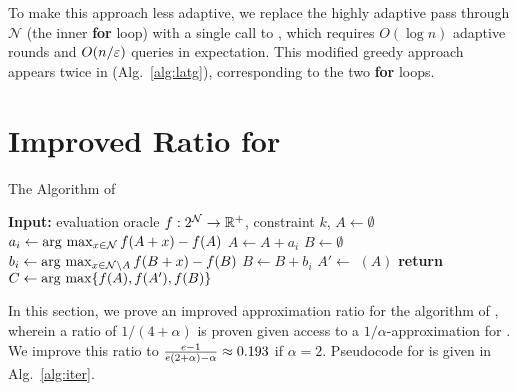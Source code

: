 To make this approach less adaptive,
we replace the highly adaptive pass through $\mathcal N$ (the inner \textbf{for} loop)
with a single call to \thresam, which requires $O( \log n )$
adaptive rounds and $O(n / \varepsilon)$ queries in expectation.
This modified greedy approach appears twice in \latg (Alg.~\ref{alg:latg}),
corresponding to the two \textbf{for} loops. 
\section{Improved Ratio for \iter} \label{apx:iter}
\begin{algorithm}[t]
   \caption{The \iter Algorithm of }
   \label{alg:iter}
   \begin{algorithmic}[1]
     \State \textbf{Input:} evaluation oracle $f:2^{\mathcal N} \to \mathbb{R}^+$, constraint $k$,
     \State $A \gets \emptyset$
     \State $a_i \gets \arg\, \max_{x \in \mathcal N} f( A + x ) - f(A)$
     \State $A \gets A + a_i$
     \EndFor
     \State $B \gets \emptyset$
     \State $b_i \gets \arg\, \max_{x \in \mathcal N \setminus A} f ( B + x ) - f (B)$
     \State $B \gets B + b_i$
     \EndFor
     \State $A' \gets $ \unc $(A)$
     \State \textbf{return} $C \gets \arg\, \max \{ f(A), f(A'), f(B) \}$
     \EndProcedure
\end{algorithmic}
\end{algorithm}
In this section, we prove an improved approximation ratio
for the algorithm \iter of , wherein a
ratio of $1/(4 + \alpha)$ is proven given access to
a $1/\alpha$-approximation for \unc. 
We improve this ratio to $\frac{e - 1}{e(2 + \alpha) - \alpha} \approx 0.193$ if $\alpha = 2$.
Pseudocode for \iter
is given in Alg.~\ref{alg:iter}.

